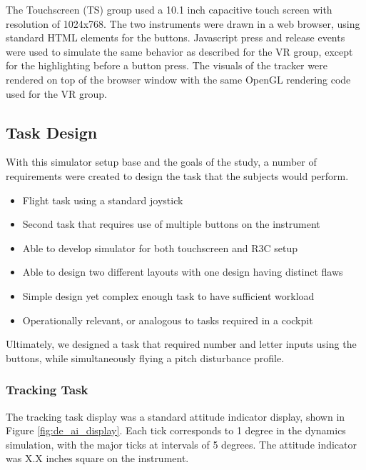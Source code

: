 The Touchscreen (TS) group used a 10.1 inch capacitive touch screen with resolution of 1024x768.
The two instruments were drawn in a web browser, using standard HTML elements for the buttons.
Javascript press and release events were used to simulate the same behavior as described for the VR group, except for the highlighting before a button press.
The visuals of the tracker were rendered on top of the browser window with the same OpenGL rendering code used for the VR group.


\subsection{Task Design}

With this simulator setup base and the goals of the study, a number of requirements were created to design the task that the subjects would perform.

\begin{itemize}
    \item Flight task using a standard joystick
    \item Second task that requires use of multiple buttons on the instrument
    \item Able to develop simulator for both touchscreen and R3C setup 
    \item Able to design two different layouts with one design having distinct flaws
    \item Simple design yet complex enough task to have sufficient workload
    \item Operationally relevant, or analogous to tasks required in a cockpit
\end{itemize}

Ultimately, we designed a task that required number and letter inputs using the buttons, while simultaneously flying a pitch disturbance profile.

\subsubsection{Tracking Task}

The tracking task display was a standard attitude indicator display, shown in Figure \ref{fig:de_ai_display}.
Each tick corresponds to 1 degree in the dynamics simulation, with the major ticks at intervals of 5 degrees.
The attitude indicator was X.X inches square on the instrument. 

